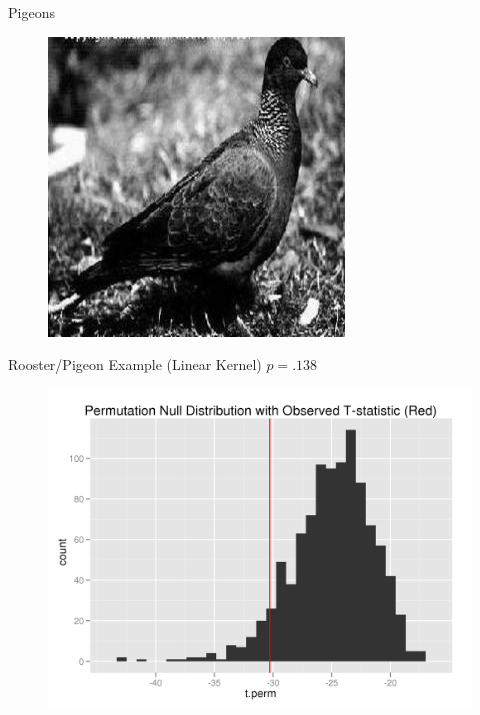 \documentclass{beamer}
\begin{document}
\begin{frame}{Pigeons}
\begin{figure}
    \includegraphics[scale=.4]{pigeonrs-image_0004.jpg}
  \end{figure}
\end{frame}

\begin{frame}{Rooster/Pigeon Example (Linear Kernel)}
  $p = .138$
  \begin{figure} 
    \centering
    \includegraphics[scale=.6]{rooster-pigeon-twosamp.png}
  \end{figure}
\end{frame}
\end{document}
